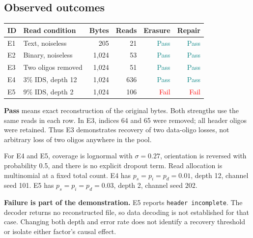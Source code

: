 \documentclass[11pt,a4paper]{article}
\newcommand{\note}[1]{\par\noindent\colorbox{light}{\parbox{\dimexpr\linewidth-2\fboxsep\relax}{\small #1}}\par}
\begin{document}
\subsection*{Observed outcomes}
{\small\begin{tabularx}{\linewidth}{lYrrrr}
\toprule ID & Read condition & Bytes & Reads & Erasure & Repair\\\midrule
E1 & Text, noiseless & 205 & 21 & \textcolor{teal}{Pass} & \textcolor{teal}{Pass} \\
E2 & Binary, noiseless & 1,024 & 53 & \textcolor{teal}{Pass} & \textcolor{teal}{Pass} \\
E3 & Two oligos removed & 1,024 & 51 & \textcolor{teal}{Pass} & \textcolor{teal}{Pass} \\
E4 & 3\% IDS, depth 12 & 1,024 & 636 & \textcolor{teal}{Pass} & \textcolor{teal}{Pass} \\
E5 & 9\% IDS, depth 2 & 1,024 & 106 & \textcolor{red}{Fail} & \textcolor{red}{Fail} \\
\bottomrule\end{tabularx}}\par
\smallskip
\textbf{Pass} means exact reconstruction of the original bytes. Both strengths use the
same reads in each row. In E3, indices 64 and 65 were removed; all header oligos were
retained. Thus E3 demonstrates recovery of two data-oligo losses, not arbitrary loss of
two oligos anywhere in the pool.

For E4 and E5, coverage is lognormal with $\sigma=0.27$, orientation is reversed with
probability 0.5, and there is no explicit dropout term. Read allocation is multinomial
at a fixed total count. E4 has $p_s=p_i=p_d=0.01$, depth 12, channel seed 101. E5 has
$p_s=p_i=p_d=0.03$, depth 2, channel seed 202.

\note{\textbf{Failure is part of the demonstration.} E5 reports \texttt{header incomplete}.
The decoder returns no reconstructed file, so data decoding is not established for that
case. Changing both depth and error rate does not identify a recovery threshold or
isolate either factor's causal effect.}
\end{document}
